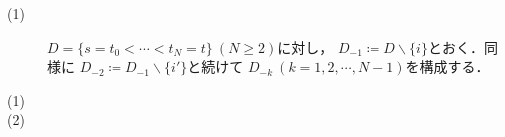 	\begin{screen}
		\begin{lem}
			
		\end{lem}
	\end{screen}
	
	\begin{prf}\mbox{}
		\begin{description}
			\item[(1)] $D = \{s=t_0 < \cdots < t_N = t\}\ (N \geq 2)$に対し，
				$D_{-1} \coloneqq D \backslash \{i\}$とおく．同様に
				$D_{-2} \coloneqq D_{-1} \backslash \{i'\}$と続けて
				$D_{-k}\ (k=1,2,\cdots,N-1)$を構成する．
		\end{description}
	\end{prf}
	
	\begin{screen}
		\begin{lem}
			\begin{description}
				\item[(1)]
				\item[(2)]
			\end{description}
		\end{lem}
	\end{screen}
